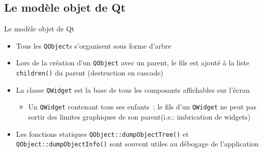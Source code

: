 \documentclass{beamer} %
\begin{document}
\subsection{Le modèle objet de Qt}
\begin{frame}{Le modèle objet de Qt}
	\begin{itemize}
	\item<+-> Tous les \texttt{QObject}s s'organisent sous forme d'arbre
	\item<+-> Lors de la création d'un \texttt{QObject} avec un parent, le fils est ajouté à la liste \texttt{children()} du parent (destruction en cascade)
	\item<+-> La classe \texttt{QWidget} est la base de tous les composants affichables sur l'écran
		\begin{itemize}
			\item<+-> Un \texttt{QWidget} contenant tous ses enfants~: le fils d'un \texttt{QWidget} ne peut pas sortir des limites graphiques de son parent(i.e.: imbrication de widgets)
		\end{itemize}
	\item<+-> Les fonctions statiques \texttt{QObject::dumpObjectTree()} et \texttt{QObject::dumpObjectInfo()} sont souvent utiles au débogage de l'application
	\end{itemize}
\end{frame}
\end{document}
